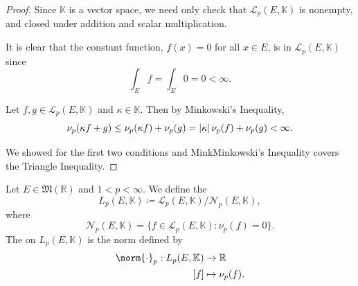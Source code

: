 \documentclass[notoc,notitlepage]{tufte-book}
\begin{document}
\begin{proof}
   Since $\mathbb{K}$ 
  is a vector space, we need only check that $\mathcal{L}_p(E, \mathbb{K})$ is
  nonempty, and closed under addition and scalar multiplication.

  \noindent
   It is clear that the
  constant function, $f(x) = 0$ for all $x \in E$, is in $\mathcal{L}_p(E,
  \mathbb{K})$ since
  \begin{equation*}
    \int_{E} f = \int_{E} 0 = 0 < \infty.
  \end{equation*}

  \noindent
   Let $f, g \in \mathcal{L}_p(E, \mathbb{K})$ and $\kappa \in
  \mathbb{K}$. Then by Minkowski's Inequality,
  \begin{equation*}
    \nu_p(\kappa f + g) \leq \nu_p(\kappa f) + \nu_p(g) = \left|\kappa\right| \nu_p(f)
    + \nu_p(g) < \infty.
  \end{equation*}

  \noindent
   We showed for the first two conditions and
  MinkMinkowski's Inequality covers the Triangle Inequality.
\end{proof}

\begin{defn}\label{defn:_l_p_space}\label{defn:_l_p_norm}
  Let $E \in \mathfrak{M}(\mathbb{R})$ and $1 < p < \infty$. We define the
  \begin{equation*}
    L_p(E, \mathbb{K}) \coloneqq \mathcal{L}_p(E, \mathbb{K}) / \mathcal{N}_p(E,
    \mathbb{K}),
  \end{equation*}
  where 
  \begin{equation*}
    \mathcal{N}_p(E, \mathbb{K}) = \{ f \in \mathcal{L}_p(E, \mathbb{K}) :
    \nu_p(f) = 0 \}.
  \end{equation*}
  The  on $L_p(E, \mathbb{K})$ is the norm defined by
  \begin{align*}
    \norm{\cdot}_p : L_p(E, \mathbb{K}) &\to \mathbb{R} \\
                     [f] &\mapsto \nu_p(f).
  \end{align*}
\end{defn}
\end{document}
